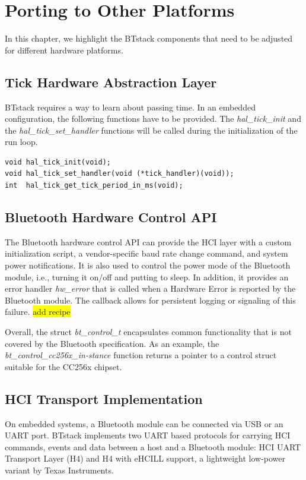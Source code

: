 \documentclass[a4paper,titlepage,oneside,12pt]{amsart} %
\newcommand{\todo}[1]{\colorbox{yellow}{#1}}
\begin{document}

\section{Porting to Other Platforms}

In this chapter, we highlight the BTstack components that need to be adjusted for different hardware platforms.
\subsection{Tick Hardware Abstraction Layer}
\label{section:tickAbstraction}

BTstack requires a way to learn about passing time. In an embedded configuration, the following functions have to be provided. The \emph{hal\_tick\_init} and the \emph{hal\_tick\_set\_handler} functions will be called during the initialization of the run loop.
 
 \begin{lstlisting}
void hal_tick_init(void);
void hal_tick_set_handler(void (*tick_handler)(void));
int  hal_tick_get_tick_period_in_ms(void);
 \end{lstlisting}
 
\subsection{Bluetooth Hardware Control API}
\label{section:bt_hw_control}
The Bluetooth hardware control API can provide the HCI layer with a custom initialization script, a vendor-specific baud rate change command, and system power notifications. It is also used to control the power mode of the Bluetooth module, i.e., turning it on/off and putting to sleep. In addition, it provides an error handler \emph{hw\_error} that is called when a Hardware Error is reported by the Bluetooth module. The callback allows for persistent logging or signaling of this failure. \todo{add recipe}

Overall, the struct \emph{bt\_control\_t} encapsulates common functionality that is not covered by the Bluetooth specification. As an example, the \emph{bt\_control\_cc256x\_in-stance} function returns a pointer to a control struct suitable for the CC256x chipset.

 \subsection{HCI Transport Implementation}
 \label{section:hci_transport}
On embedded systems, a Bluetooth module can be connected via USB or an UART port. BTstack implements two UART based protocols for carrying HCI commands, events and data between a host and a Bluetooth module: HCI UART Transport Layer (H4) and H4 with eHCILL support, a lightweight low-power variant by Texas Instruments.
\end{document}
